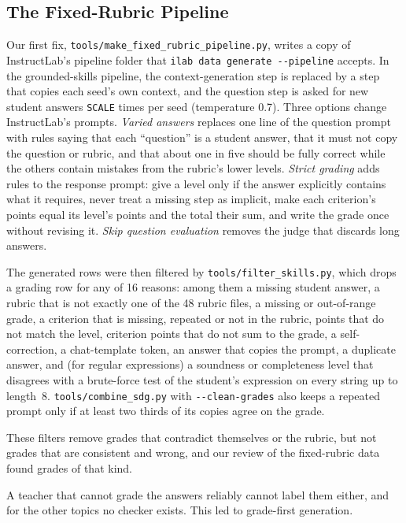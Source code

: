 \documentclass[11pt,a4paper]{article}
\newif\ifdraft
\newcommand{\todo}[2]{%
  \ifdraft\textcolor{red}{\textbf{[TODO #1:} #2\textbf{]}}\fi}
\newcommand{\file}[1]{\nolinkurl{#1}}
\theoremstyle{definition}
\begin{document}
\subsection{The Fixed-Rubric Pipeline}\label{sec:fixed}
Our first fix, \file{tools/make_fixed_rubric_pipeline.py}, writes a copy of InstructLab's pipeline folder that \texttt{ilab data generate -{}-pipeline} accepts. In the grounded-skills pipeline, the context-generation step is replaced by a step that copies each seed's own context, and the question step is asked for new student answers \texttt{SCALE} times per seed (temperature 0.7). Three options change InstructLab's prompts. \emph{Varied answers} replaces one line of the question prompt with rules saying that each ``question'' is a student answer, that it must not copy the question or rubric, and that about one in five should be fully correct while the others contain mistakes from the rubric's lower levels. \emph{Strict grading} adds rules to the response prompt: give a level only if the answer explicitly contains what it requires, never treat a missing step as implicit, make each criterion's points equal its level's points and the total their sum, and write the grade once without revising it. \emph{Skip question evaluation} removes the judge that discards long answers.

The generated rows were then filtered by \file{tools/filter_skills.py}, which drops a grading row for any of 16 reasons: among them a missing student answer, a rubric that is not exactly one of the 48 rubric files, a missing or out-of-range grade, a criterion that is missing, repeated or not in the rubric, points that do not match the level, criterion points that do not sum to the grade, a self-correction, a chat-template token, an answer that copies the prompt, a duplicate answer, and (for regular expressions) a soundness or completeness level that disagrees with a brute-force test of the student's expression on every string up to length~8. \file{tools/combine_sdg.py} with \texttt{-{}-clean-grades} also keeps a repeated prompt only if at least two thirds of its copies agree on the grade.

These filters remove grades that contradict themselves or the rubric, but not grades that are consistent and wrong, and our review of the fixed-rubric data found grades of that kind.
\todo{}{Report the share of regex rows whose C1/C2 level disagreed with \file{tools/check_regex_grades.py} in the fixed-rubric data (the stage-2 v1 file on Fir), and the drop counts from \file{report.md} of \file{filter_skills.py}.}
A teacher that cannot grade the answers reliably cannot label them either, and for the other topics no checker exists. This led to grade-first generation.
\end{document}
